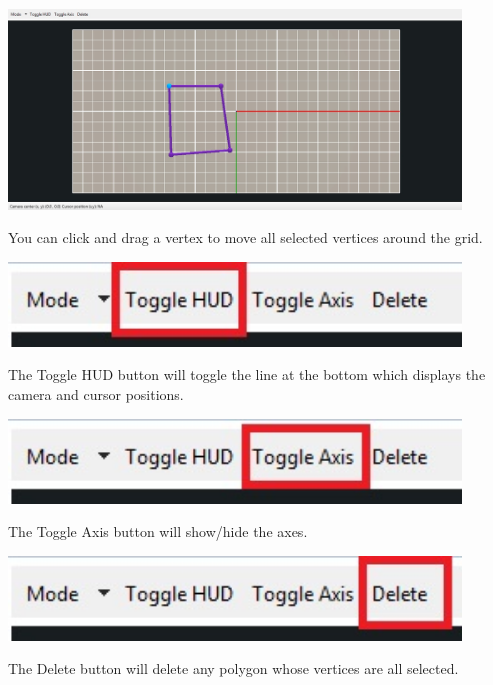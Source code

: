 \documentclass{article}
\begin{document}
\begin{center}
\includegraphics[width=12cm]{images/SelectedVertex}
\end{center}

You can click and drag a vertex to move all selected vertices around the grid.

\begin{center}
\includegraphics[width=12cm]{images/ToggleHUD}
\end{center}

The Toggle HUD button will toggle the line at the bottom which displays the
camera and cursor positions. 

\begin{center}
\includegraphics[width=12cm]{images/ToggleAxis}
\end{center}

The Toggle Axis button will show/hide the axes.

\begin{center}
\includegraphics[width=12cm]{images/DeleteMesh}
\end{center}

The Delete button will delete any polygon whose vertices are all selected.
\end{document}
